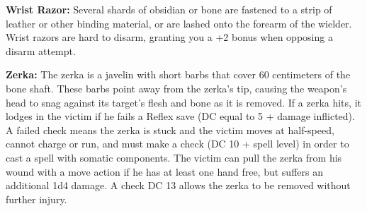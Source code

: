 \textbf{Wrist Razor:} Several shards of obsidian or bone are fastened to a strip of leather or other binding material, or are lashed onto the forearm of the wielder. Wrist razors are hard to disarm, granting you a +2 bonus when opposing a disarm attempt.

\textbf{Zerka:} The zerka is a javelin with short barbs that cover 60 centimeters of the bone shaft. These barbs point away from the zerka's tip, causing the weapon's head to snag against its target's flesh and bone as it is removed. If a zerka hits, it lodges in the victim if he fails a Reflex save (DC equal to 5 + damage inflicted). A failed check means the zerka is stuck and the victim moves at half-speed, cannot charge or run, and must make a  check (DC 10 + spell level) in order to cast a spell with somatic components. The victim can pull the zerka from his wound with a move action if he has at least one hand free, but suffers an additional 1d4 damage. A  check DC 13 allows the zerka to be removed without further injury.
